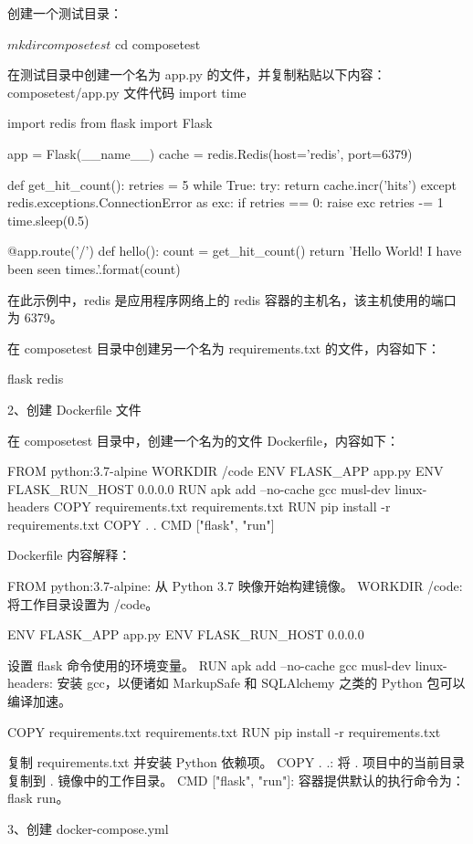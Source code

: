 创建一个测试目录：

$ mkdir composetest
$ cd composetest

在测试目录中创建一个名为 app.py 的文件，并复制粘贴以下内容：
composetest/app.py 文件代码
import time

import redis
from flask import Flask

app = Flask(__name__)
cache = redis.Redis(host='redis', port=6379)


def get_hit_count():
    retries = 5
    while True:
        try:
            return cache.incr('hits')
        except redis.exceptions.ConnectionError as exc:
            if retries == 0:
                raise exc
            retries -= 1
            time.sleep(0.5)


@app.route('/')
def hello():
    count = get_hit_count()
    return 'Hello World! I have been seen {} times.\n'.format(count)

在此示例中，redis 是应用程序网络上的 redis 容器的主机名，该主机使用的端口为 6379。

在 composetest 目录中创建另一个名为 requirements.txt 的文件，内容如下：

flask
redis

2、创建 Dockerfile 文件

在 composetest 目录中，创建一个名为的文件 Dockerfile，内容如下：

FROM python:3.7-alpine
WORKDIR /code
ENV FLASK_APP app.py
ENV FLASK_RUN_HOST 0.0.0.0
RUN apk add --no-cache gcc musl-dev linux-headers
COPY requirements.txt requirements.txt
RUN pip install -r requirements.txt
COPY . .
CMD ["flask", "run"]

Dockerfile 内容解释：

    FROM python:3.7-alpine: 从 Python 3.7 映像开始构建镜像。
    WORKDIR /code: 将工作目录设置为 /code。

    ENV FLASK_APP app.py
    ENV FLASK_RUN_HOST 0.0.0.0

    设置 flask 命令使用的环境变量。
    RUN apk add --no-cache gcc musl-dev linux-headers: 安装 gcc，以便诸如 MarkupSafe 和 SQLAlchemy 之类的 Python 包可以编译加速。

    COPY requirements.txt requirements.txt
    RUN pip install -r requirements.txt

    复制 requirements.txt 并安装 Python 依赖项。
    COPY . .: 将 . 项目中的当前目录复制到 . 镜像中的工作目录。
    CMD ["flask", "run"]: 容器提供默认的执行命令为：flask run。

3、创建 docker-compose.yml

